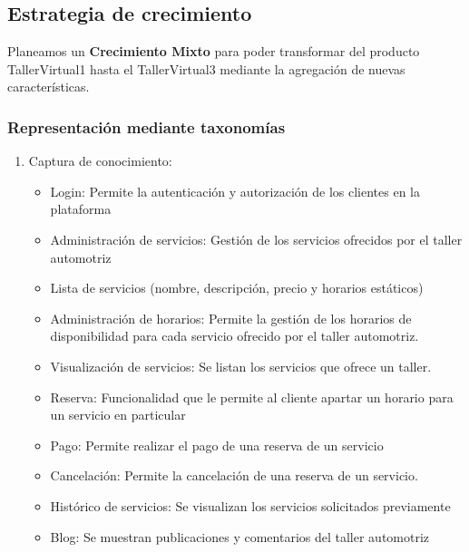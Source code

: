 \documentclass[10pt,a4paper,openany]{book}
\begin{document}
\subsection{Estrategia de crecimiento}

Planeamos  un \textbf{Crecimiento Mixto} para poder transformar del producto TallerVirtual1 hasta el TallerVirtual3 mediante la agregación de nuevas características.

\subsubsection{Representación mediante taxonomías}
\begin{enumerate}
\item Captura de conocimiento:
	\begin{itemize}
		\item Login: Permite la autenticación y autorización de los clientes en la plataforma
		\item Administración de servicios: Gestión de los servicios ofrecidos por el taller automotriz
		\item Lista de servicios (nombre, descripción, precio y horarios estáticos)
		\item Administración de horarios: Permite la gestión de los horarios de disponibilidad para cada servicio ofrecido por el taller automotriz.
		\item Visualización de servicios: Se listan los servicios que ofrece un taller.
		\item Reserva: Funcionalidad que le permite al cliente apartar un horario para un servicio en particular
		\item Pago: Permite realizar el pago de una reserva de un servicio
		\item Cancelación: Permite la cancelación de una reserva de un servicio.
		\item Histórico de servicios: Se visualizan los servicios solicitados previamente
		\item Blog: Se muestran publicaciones y comentarios del taller automotriz
	\end{itemize}
\end{enumerate}
\end{document}

